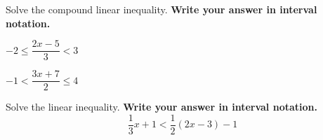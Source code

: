 \vfill

\begin{center}\hfill
	\raisebox{0.4em}{
		\rotatebox{\rotationdegree}{
			\parbox{\textwidth}{
				\begin{enumerate*}[label={\theexer~(\arabic*)~}]
					\item  $(1, +\infty)$
					\item  $(-\infty, -1)\cup [3, +\infty)$\hfill\null
				\end{enumerate*}
			}
		}
	}
\end{center}



\begin{exercise}
	Solve the compound linear inequality. \textbf{Write your answer in interval notation.}

	\noindent
	\begin{enumerate*}[label=\textup{(\arabic*)~}]
		\item  $-2\leq \dfrac{2x-5}{3}<3$
		\item  $-1< \dfrac{3x+7}{2}\leq 4$
		\hfill\null
	\end{enumerate*}
\end{exercise}

\vfill

\begin{center}\hfill
\end{center}


\newpage

\begin{exercise}
	Solve the linear inequality. \textbf{Write your answer in interval notation.}
\[
\frac13x+1<\frac12(2x-3)-1
\]

\end{exercise}

\vfill

\begin{center}\hfill
\end{center}


